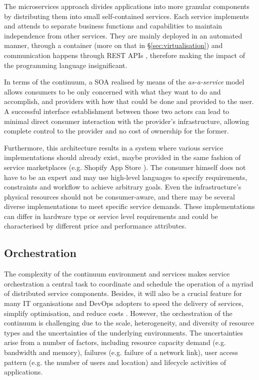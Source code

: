 The microservices approach divides applications into more granular components by distributing them into small self-contained services. Each service implements and attends to separate business functions and capabilities to maintain independence from other services. They are mainly deployed in an automated manner, through a container (more on that in §\ref{sec:virtualisation}) and communication happens through REST APIs \cite{rest}, therefore making the impact of the programming language insignificant.

In terms of the continuum, a SOA realised by means of the \emph{as-a-service} model allows consumers to be only concerned with what they want to do and accomplish, and providers with how that could be done and provided to the user. A successful interface establishment between those two actors can lead to minimal direct consumer interaction with the provider's infrastructure, allowing complete control to the provider and no cost of ownership for the former.

Furthermore, this architecture results in a system where various service implementations should already exist, maybe provided in the same fashion of service marketplaces (e.g. Shopify App Store \cite{shopify}). The consumer himself does not have to be an expert and may use high-level languages to specify requirements, constraints and workflow to achieve arbitrary goals. Even the infrastructure's physical resources should not be consumer-aware, and there may be several diverse implementations to meet specific service demands. These implementations can differ in hardware type or service level requirements and could be characterised by different price and performance attributes.

\subsection{Orchestration}

The complexity of the continuum environment and services makes service orchestration a central task to coordinate and schedule the operation of a myriad of distributed service components. Besides, it will also be a crucial feature for many IT organisations and DevOps adopters to speed the delivery of services, simplify optimisation, and reduce costs \cite{akamai}. However, the orchestration of the continuum is challenging due to the scale, heterogeneity, and diversity of resource types and the uncertainties of the underlying environments. The uncertainties arise from a number of factors, including resource capacity demand (e.g. bandwidth and memory), failures (e.g. failure of a network link), user access pattern (e.g. the number of users and location) and lifecycle activities of applications.

